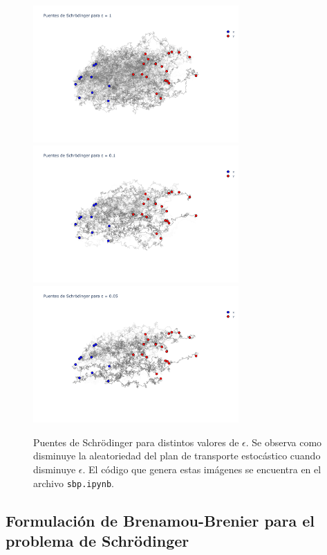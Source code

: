 \begin{figure}[!ht]
	\centering
	\includegraphics[width=0.7\textwidth]{images/eot_sbp/sbp_solution1}
	\includegraphics[width=0.7\textwidth]{images/eot_sbp/sbp_solution0.1}
	\includegraphics[width=0.7\textwidth]{images/eot_sbp/sbp_solution0.05}
	\caption{Puentes de Schrödinger para distintos valores de $\epsilon$. Se observa como disminuye la aleatoriedad del plan de transporte estocástico cuando disminuye $\epsilon$. El código que genera estas imágenes se encuentra en el archivo \texttt{sbp.ipynb}.}
	\label{fig:sbp}
\end{figure}


\subsection{Formulación de Brenamou-Brenier para el problema de Schrödinger}
\label{eot_sbp/dynamic/schrodinger_equations}

